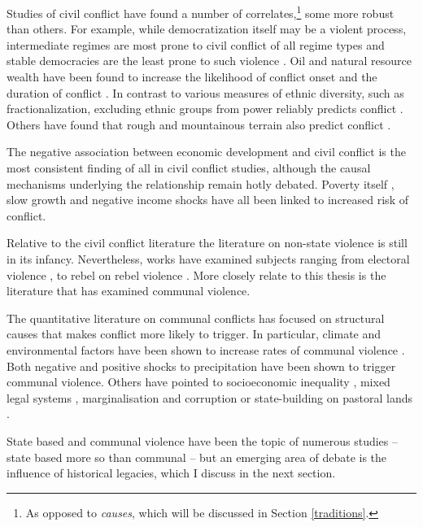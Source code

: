 Studies of civil conflict have found a number of correlates,\footnote{As opposed
to \textit{causes}, which will be discussed in Section \ref{traditions}.} some more
robust than others. For example, while democratization itself may be a violent
process, intermediate regimes are most prone to civil conflict of all regime
types and stable democracies are the least prone to such violence
\citep{Hegre2001, Goldstone_2010}. Oil and natural resource wealth have been
found to increase the likelihood of conflict onset and the duration of conflict
\citep{Lujala2010, Lujala2005, Lujala_2008, Ross_2006}. In contrast to various
measures of ethnic diversity, such as fractionalization, excluding ethnic groups
from power reliably predicts conflict \citep{CedermanLars-Erik2013Igac}. Others
have found that rough and mountainous terrain also predict conflict
\citep{Buhaug_2010, Hegre2006}.

The negative association between economic development and civil conflict is the
most consistent finding of all in civil conflict studies, although the causal
mechanisms underlying the relationship remain hotly debated. Poverty itself
\citep{Hegre2006}, slow growth \citep{Hegre2006} and negative income shocks have
all been linked to increased risk of conflict.

Relative to the civil conflict literature the literature on non-state violence
is still in its infancy. Nevertheless, works have examined subjects ranging from
electoral violence \citep{Fjelde_2020, Salehyan_2014, Burchard_2015}, to rebel
on rebel violence \citep{Fjelde_2012, Lilja_2011, Cunningham_2012, Nygard_2014}.
More closely relate to this thesis is the literature that has examined communal
violence.

The quantitative literature on communal conflicts has focused on structural
causes that makes conflict more likely to trigger. In particular, climate and
environmental factors have been shown to increase rates of communal violence
\citep{Turner_2011}. Both negative \citep{Detges_2017, Fjelde2012,
van_Weezel_2019, Petrova_2022} and positive \citep{Theisen2012, Witsenburg2012}
shocks to precipitation have been shown to trigger communal violence. Others
have pointed to socioeconomic inequality \citep{Fjelde2014, PETERS_2004}, mixed
legal systems \citep{Eck2014}, marginalisation and corruption
\citep{BENJAMINSEN_2009} or state-building on pastoral lands
\citep{hagmann2008pastoral}.

State based and communal violence have been the topic of numerous studies --
state based more so than communal -- but an emerging area of debate is the
influence of historical legacies, which I discuss in the next section. 

